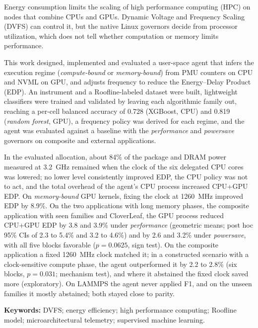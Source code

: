Energy consumption limits the scaling of high performance computing (HPC) on nodes that combine CPUs and GPUs. Dynamic Voltage and Frequency Scaling (DVFS) can control it, but the native Linux governors decide from processor utilization, which does not tell whether computation or memory limits performance.

This work designed, implemented and evaluated a user-space agent that infers the execution regime (\textit{compute-bound} or \textit{memory-bound}) from PMU counters on CPU and NVML on GPU, and adjusts frequency to reduce the Energy--Delay Product (EDP). An instrument and a Roofline-labeled dataset were built, lightweight classifiers were trained and validated by leaving each algorithmic family out, reaching a per-cell balanced accuracy of 0.728 (XGBoost, CPU) and 0.819 (\textit{random forest}, GPU), a frequency policy was derived for each regime, and the agent was evaluated against a baseline with the \textit{performance} and \textit{powersave} governors on composite and external applications.

In the evaluated allocation, about 84\% of the package and DRAM power measured at 3.2~GHz remained when the clock of the six delegated CPU cores was lowered; no lower level consistently improved EDP, the CPU policy was not to act, and the total overhead of the agent's CPU process increased CPU+GPU EDP. On \textit{memory-bound} GPU kernels, fixing the clock at 1260~MHz improved EDP by 8.9\%. On the two applications with long memory phases, the composite application with seen families and CloverLeaf, the GPU process reduced CPU+GPU EDP by 3.8 and 3.9\% under \textit{performance} (geometric means; post hoc 95\% CIs of 2.3 to 5.4\% and 3.2 to 4.6\%) and by 2.6 and 3.2\% under \textit{powersave}, with all five blocks favorable ($p=0.0625$, sign test). On the composite application a fixed 1260~MHz clock matched it; in a constructed scenario with a clock-sensitive compute phase, the agent outperformed it by 2.2 to 2.8\% (six blocks, $p=0.031$; mechanism test), and where it abstained the fixed clock saved more (exploratory). On LAMMPS the agent never applied F1, and on the unseen families it mostly abstained; both stayed close to parity.

\enlargethispage{2\baselineskip}
\noindent\textbf{Keywords:} DVFS; energy efficiency; high performance computing; Roofline model; microarchitectural telemetry; supervised machine learning.

